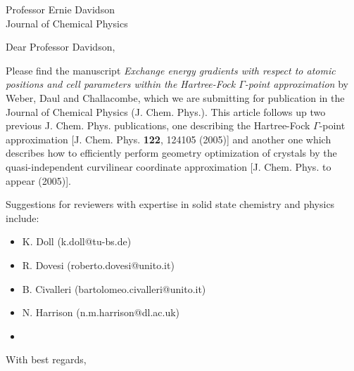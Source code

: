 
\pagestyle{empty}

\signature{V. Weber}

\address{
V. Weber \\
(valeryw@lanl.gov) \\
Theoretical Division \\
Group T-12, MS B268 \\
Los Alamos National Laboratory \\
Los Alamos, NM 87545 }

\date{November 30, 2005}

\begin{letter}{
Professor Ernie Davidson\\
Journal of Chemical Physics
}

\opening{Dear Professor Davidson,}

Please find the manuscript {\em Exchange energy gradients with respect 
to atomic positions and cell parameters within the Hartree-Fock 
$\Gamma$-point approximation} by Weber, Daul and Challacombe, which we are 
submitting for publication in the Journal of Chemical Physics (J. Chem. Phys.). 
This article follows up two previous J. Chem. Phys. publications, one 
describing the Hartree-Fock $\Gamma$-point approximation [J. Chem. Phys. {\bf 122}, 124105 (2005)] 
and another one which describes how to efficiently perform geometry optimization of crystals by the 
quasi-independent curvilinear coordinate approximation [J. Chem. Phys. to appear (2005)].

Suggestions for reviewers with expertise in solid state chemistry and physics include: 
\begin{itemize}
\item K. Doll (k.doll@tu-bs.de)
\item R. Dovesi (roberto.dovesi@unito.it)
\item B. Civalleri (bartolomeo.civalleri@unito.it)
\item N. Harrison (n.m.harrison@dl.ac.uk)
\item 
\end{itemize}


\closing{With best regards,}
\end{letter}

